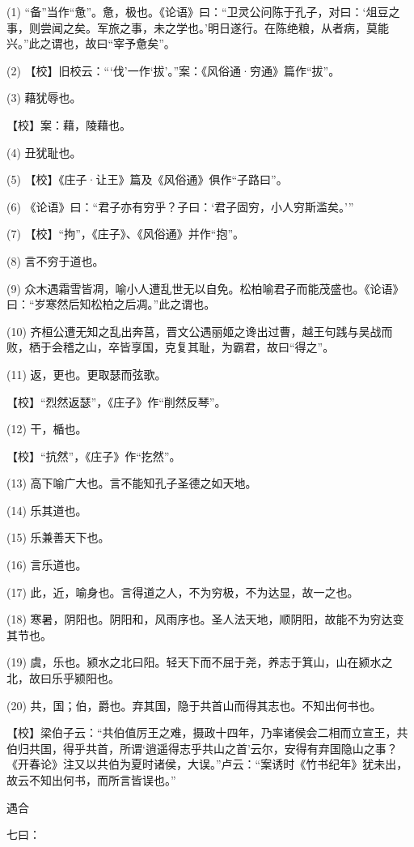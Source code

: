 \documentclass[12pt,UTF8]{ctexbook}
\begin{document}
(1) “备”当作“惫”。惫，极也。《论语》曰：“卫灵公问陈于孔子，对曰：‘俎豆之事，则尝闻之矣。军旅之事，未之学也。’明日遂行。在陈绝粮，从者病，莫能兴。”此之谓也，故曰“宰予惫矣”。

(2) 【校】旧校云：“‘伐’一作‘拔’。”案：《风俗通·穷通》篇作“拔”。

(3) 藉犹辱也。

【校】案：藉，陵藉也。

(4) 丑犹耻也。

(5) 【校】《庄子·让王》篇及《风俗通》俱作“子路曰”。

(6) 《论语》曰：“君子亦有穷乎？子曰：‘君子固穷，小人穷斯滥矣。’”

(7) 【校】“拘”，《庄子》、《风俗通》并作“抱”。

(8) 言不穷于道也。

(9) 众木遇霜雪皆凋，喻小人遭乱世无以自免。松柏喻君子而能茂盛也。《论语》曰：“岁寒然后知松柏之后凋。”此之谓也。

(10) 齐桓公遭无知之乱出奔莒，晋文公遇丽姬之谗出过曹，越王句践与吴战而败，栖于会稽之山，卒皆享国，克复其耻，为霸君，故曰“得之”。

(11) 返，更也。更取瑟而弦歌。

【校】“烈然返瑟”，《庄子》作“削然反琴”。

(12) 干，楯也。

【校】“抗然”，《庄子》作“扢然”。

(13) 高下喻广大也。言不能知孔子圣德之如天地。

(14) 乐其道也。

(15) 乐兼善天下也。

(16) 言乐道也。

(17) 此，近，喻身也。言得道之人，不为穷极，不为达显，故一之也。

(18) 寒暑，阴阳也。阴阳和，风雨序也。圣人法天地，顺阴阳，故能不为穷达变其节也。

(19) 虞，乐也。颍水之北曰阳。轻天下而不屈于尧，养志于箕山，山在颍水之北，故曰乐乎颍阳也。

(20) 共，国；伯，爵也。弃其国，隐于共首山而得其志也。不知出何书也。

【校】梁伯子云：“共伯值厉王之难，摄政十四年，乃率诸侯会二相而立宣王，共伯归共国，得乎共首，所谓‘逍遥得志乎共山之首’云尔，安得有弃国隐山之事？《开春论》注又以共伯为夏时诸侯，大误。”卢云：“案诱时《竹书纪年》犹未出，故云不知出何书，而所言皆误也。”





遇合


七曰：
\end{document}

